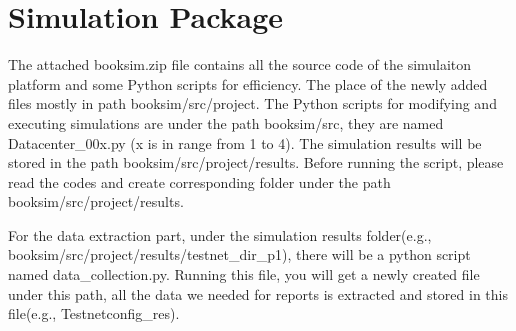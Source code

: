 \chapter{Simulation Package}
The attached booksim.zip file contains all the source code of the simulaiton platform and some Python scripts for efficiency. The place of the newly added files mostly in path booksim/src/project.
The Python scripts for modifying and executing simulations are under the path booksim/src, they are named Datacenter\_00x.py (x is in range from 1 to 4). The simulation results will be stored in the path booksim/src/project/results. Before running the script, please read the codes and create corresponding folder under the path booksim/src/project/results.

For the data extraction part, under the simulation results folder(e.g., booksim/src/project/results/testnet\_dir\_p1), there will be a python script named data\_collection.py. 
Running this file, you will get a newly created file under this path, all the data we needed for reports is extracted and stored in this file(e.g., Testnetconfig\_res).